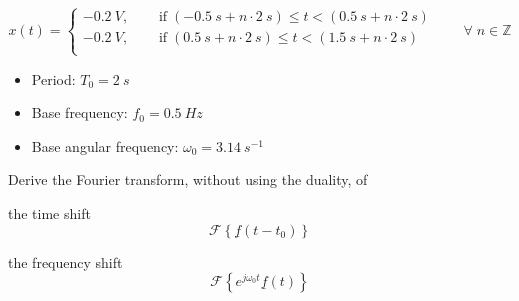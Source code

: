 \begin{solution}
	\begin{tasks}
		\task
		\begin{equation*}
			x(t) = \begin{cases}
				\SI{-0.2}{V}, &\quad \text{ if} \; \left(\SI{-0.5}{s} + n \cdot \SI{2}{s}\right) \leq t < \left(\SI{0.5}{s} + n \cdot \SI{2}{s}\right)  \\
				\SI{-0.2}{V}, &\quad \text{ if} \; \left(\SI{0.5}{s} + n \cdot \SI{2}{s}\right) \leq t < \left(\SI{1.5}{s} + n \cdot \SI{2}{s}\right) \\
			\end{cases} \qquad \forall \; n \in \mathbb{Z}
		\end{equation*}
		
		\task
		\begin{itemize}
			\item Period: $T_0 = \SI{2}{s}$
			\item Base frequency: $f_0 = \SI{0,5}{Hz}$
			\item Base angular frequency: $\omega_0 = \SI{3.14}{s^{-1}}$
		\end{itemize}
	
	\end{tasks}
\end{solution}

\begin{question}[subtitle={Using the Fourier Transform}]
	Derive the Fourier transform, without using the duality, of
	\begin{tasks}
		\task
		the time shift
		\begin{equation*}
			\mathcal{F}\left\{\underline{f}(t - t_0)\right\}
		\end{equation*}
		
		\task
		the frequency shift
		\begin{equation*}
			\mathcal{F}\left\{e^{j \omega_0 t} \underline{f}(t)\right\}
		\end{equation*}
		
	\end{tasks}
\end{question}

